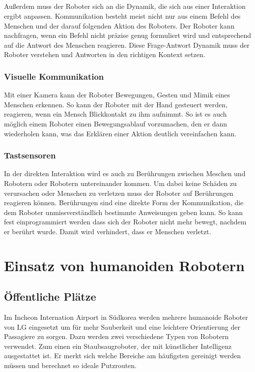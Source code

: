 \subparagraph{}
Außerdem muss der Roboter sich an die Dynamik, die sich aus einer Interaktion
ergibt anpassen. Kommunikation besteht meist nicht nur aus einem Befehl des
Menschen und der darauf folgenden Aktion des Roboters. Der Roboter kann
nachfragen, wenn ein Befehl nicht präzise genug formuliert wird und entsprechend
auf die Antwort des Menschen reagieren. Diese Frage-Antwort Dynamik muss der
Roboter verstehen und Antworten in den richtigen Kontext setzen.

\subsubsection{Visuelle Kommunikation}
Mit einer Kamera kann der Roboter Bewegungen, Gesten und Mimik eines Menschen
erkennen. So kann der Roboter mit der Hand gesteuert werden, reagieren, wenn ein
Mensch Blickkontakt zu ihm aufnimmt. So ist es auch möglich einem Roboter einen
Bewegungsablauf vorzumachen, den er dann wiederholen kann, was das Erklären
einer Aktion deutlich vereinfachen kann.

\subsubsection{Tastsensoren}
In der direkten Interaktion wird es auch zu
Berührungen zwischen Meschen und Robotern oder Robotern untereinander kommen. Um
dabei keine Schäden zu verursachen oder Menschen zu verletzen muss der Roboter
auf Berührungen reagieren können. Berührungen sind eine direkte Form der
Kommunikation, die dem Roboter unmissverständlich bestimmte Anweisungen geben
kann. So kann fest einprogrammiert werden dass sich der Roboter nicht mehr
bewegt, nachdem er berührt wurde. Damit wird verhindert, dass er Menschen
verletzt. \cite{Prassler2004}

\section{Einsatz von humanoiden Robotern}\label{sec:einsatz}
\subsection{Öffentliche Plätze}\label{sec:oeffentliche-plaetze}
Im Incheon Internation Airport in Südkorea werden mehrere humanoide Roboter von
LG eingesetzt um für mehr Sauberkeit und eine leichtere Orientierung der
Passagiere zu sorgen. Dazu werden zwei verschiedene Typen von Robotern
verwendet. Zum einen ein Staubsaugroboter, der mit künstlicher Intelligenz
ausgestattet ist. Er merkt sich welche Bereiche am häufigsten gereinigt werden
müssen und berechnet so ideale Putzrouten.

